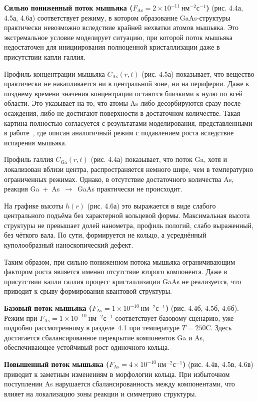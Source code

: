 \documentclass[14pt,oneside]{extarticle}
\begin{document}
\textbf{Сильно пониженный поток мышьяка ($F_\mathrm{As} = 2 \times 10^{-11}~\text{нм}^{-2}\text{с}^{-1}$)} (рис. 4.4а, 4.5а, 4.6а) соответствует режиму, в котором образование GaAs-структуры практически невозможно вследствие крайней нехватки атомов мышьяка. Это экстремальное условие моделирует ситуацию, при которой поток мышьяка недостаточен для инициирования полноценной кристаллизации даже в присутствии капли галлия.

Профиль концентрации мышьяка $C_\mathrm{As}(r, t)$ (рис. 4.5а) показывает, что вещество практически не накапливается ни в центральной зоне, ни на периферии. Даже к позднему времени значения концентрации остаются близкими к нулю по всей области. Это указывает на то, что атомы As либо десорбируются сразу после осаждения, либо не достигают поверхности в достаточном количестве. Такая картина полностью согласуется с результатами моделирования, представленными в работе~\cite{fan2023evaporation}, где описан аналогичный режим с подавлением роста вследствие испарения мышьяка.

Профиль галлия $C_\mathrm{Ga}(r, t)$ (рис. 4.4а) показывает, что поток Ga, хотя и локализован вблизи центра, распространяется немного шире, чем в температурно ограниченных режимах. Однако, в отсутствие достаточного количества As, реакция Ga~+~As~$\rightarrow$~GaAs практически не происходит.

На графике высоты $h(r)$ (рис. 4.6а) это выражается в виде слабого центрального подъёма без характерной кольцевой формы. Максимальная высота структуры не превышает долей нанометра, профиль пологий, слабо выраженный, без чёткого вала. По сути, формируется не кольцо, а усреднённый куполообразный наноскопический дефект.

Таким образом, при сильно пониженном потока мышьяка ограничивающим фактором роста является именно отсутствие второго компонента. Даже в присутствии капли галлия процесс кристаллизации GaAs не реализуется, что приводит к срыву формирования квантовой структуры.

\textbf{Базовый поток мышьяка ($F_\mathrm{As} = 1 \times 10^{-10}~\text{нм}^{-2}\text{с}^{-1}$)} (рис. 4.4б, 4.5б, 4.6б). Режим при $F_\mathrm{As} = 1 \times 10^{-10}~\text{нм}^{-2}\text{с}^{-1}$ соответствует базовому сценарию, уже подробно рассмотренному в разделе~4.1 при температуре $T = 250$\textdegree C. Здесь достигается сбалансированное перекрытие компонентов Ga и As, обеспечивающее устойчивый рост одиночного кольца.
 
\textbf{Повышенный поток мышьяка ($F_\mathrm{As} = 4 \times 10^{-10}~\text{нм}^{-2}\text{с}^{-1}$)} (рис. 4.4в, 4.5в, 4.6в) приводит к заметным изменениям в морфологии кольца. При избыточном поступлении As нарушается сбалансированность между компонентами, что влияет на локализацию зоны реакции и симметрию структуры.
\end{document}
